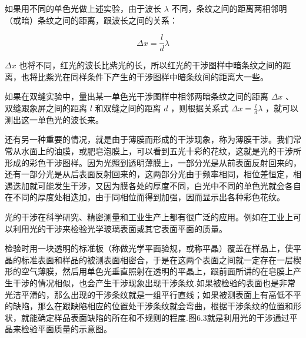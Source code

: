 如果用不同的单色光做上述实验，由于波长 \(\lambda\)
不同，条纹之间的距离两相邻明（或暗）条纹之间的距离，跟波长之间的关系：

\[
\Delta x = \frac {l}{d} \lambda
\]

\(\Delta x\)
也将不同，红光的波长比紫光的长，所以红光的干涉图样中暗条纹之间的距离，也将比紫光在同样条件下产生的干涉图样中暗条纹间的距离大一些。

如果在双缝实验中，量出某一单色光干涉图样中相邻两暗条纹之间的距离
\(\Delta x\) 、双缝跟象屏之间的距离 \(l\) 和双缝之间的距离 \(d\)
，则根据关系式 \(\Delta x = \frac{l}{d}\lambda\)
，就可以测出这一单色光的波长来。

还有另一种重要的情况，就是由于薄膜而形成的干涉现象，称为薄膜干涉。我们常常从水面上的油膜，或肥皂泡膜上，可以看到五光十彩的花纹，这就是光的干涉所形成的彩色干涉图样。因为光照到透明薄膜上，一部分光是从前表面反射回来的，还有一部分光是从后表面反射回来的，这两部分光由于频率相同，相位差恒定，相遇迭加就可能发生干涉，又因为膜各处的厚度不同，白光中不同的单色光就会各自在不同的厚度处相迭加，由于同相位而得到加强，因而显示出各种彩色花纹。

光的干涉在科学研究、精密测量和工业生产上都有很广泛的应用。例如在工业上可以利用光的干涉来检验光学玻璃表面或其它表面平面的质量。

检验时用一块透明的标准板（称做光学平面验规，或称平晶）覆盖在样品上，使平晶的标准表面和样品的被测表面相密合，于是在这两个表面之间就一定存在一层楔形的空气薄膜，然后用单色光垂直照射在透明的平晶上，跟前面所讲的在皂膜上产生干涉的情况相似，也会产生干涉现象出现干涉条纹.如果被检验的表面也是非常光洁平滑的，那么出现的干涉条纹就是一组平行直线；如果被测表面上有高低不平的缺陷，那么在跟缺陷相应的位置处干涉条纹就会弯曲，根据干涉条纹的位置和形状，就能确定样品表面缺陷的所在和不规则的程度.图6.3就是利用光的干涉通过平晶来检验平面质量的示意图。

